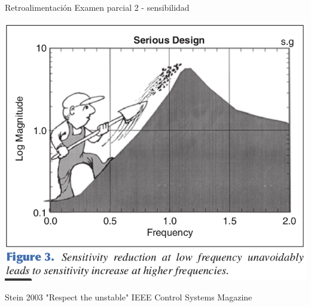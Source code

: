 \documentclass[presentation,aspectratio=169]{beamer}
\begin{document}
\begin{frame}[label={sec:org26741e6}]{Retroalimentación Examen parcial 2 - sensibilidad}
\begin{center}
\includegraphics[width=0.6\linewidth]{../../figures/stein-serious-design.png}
\end{center}

{\footnotesize Stein 2003 "Respect the unstable" IEEE Control Systems Magazine}
\end{frame}
\end{document}

